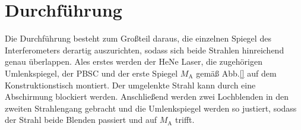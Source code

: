 
\section{Durchführung}
\label{sec:Durchführung}
Die Durchführung besteht zum Großteil daraus, die einzelnen Spiegel des Interferometers derartig auszurichten, sodass sich beide Strahlen hinreichend genau überlappen.
Ales erstes werden der HeNe Laser, die zugehörigen Umlenkspiegel, der PBSC und der erste Spiegel $M_\text{A}$ gemäß Abb.\ref{} auf dem Konstruktionstisch montiert. Der umgelenkte Strahl kann durch eine Abschirmung blockiert werden. Anschließend werden zwei Lochblenden in den zweiten Strahlengang gebracht und die Umlenkspiegel werden so justiert, sodass der Strahl beide Blenden passiert und auf $M_\text{A}$ trifft.